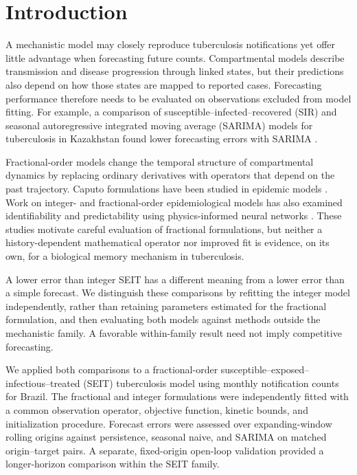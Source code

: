 \documentclass[pdflatex,sn-mathphys-ay]{sn-jnl}
\begin{document}
\section{Introduction}
A mechanistic model may closely reproduce tuberculosis notifications yet offer little advantage when forecasting future counts. Compartmental models describe transmission and disease progression through linked states, but their predictions also depend on how those states are mapped to reported cases. Forecasting performance therefore needs to be evaluated on observations excluded from model fitting. For example, a comparison of susceptible--infected--recovered (SIR) and seasonal autoregressive integrated moving average (SARIMA) models for tuberculosis in Kazakhstan found lower forecasting errors with SARIMA \citep{kalizhanova2024}.

Fractional-order models change the temporal structure of compartmental dynamics by replacing ordinary derivatives with operators that depend on the past trajectory. Caputo formulations have been studied in epidemic models \citep{area2015}. Work on integer- and fractional-order epidemiological models has also examined identifiability and predictability using physics-informed neural networks \citep{kharazmi2021}. These studies motivate careful evaluation of fractional formulations, but neither a history-dependent mathematical operator nor improved fit is evidence, on its own, for a biological memory mechanism in tuberculosis.

A lower error than integer SEIT has a different meaning from a lower error than a simple forecast. We distinguish these comparisons by refitting the integer model independently, rather than retaining parameters estimated for the fractional formulation, and then evaluating both models against methods outside the mechanistic family. A favorable within-family result need not imply competitive forecasting.

We applied both comparisons to a fractional-order susceptible--exposed--infectious--treated (SEIT) tuberculosis model using monthly notification counts for Brazil. The fractional and integer formulations were independently fitted with a common observation operator, objective function, kinetic bounds, and initialization procedure. Forecast errors were assessed over expanding-window rolling origins against persistence, seasonal naive, and SARIMA on matched origin--target pairs. A separate, fixed-origin open-loop validation provided a longer-horizon comparison within the SEIT family.
\end{document}
